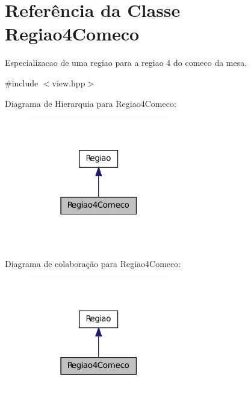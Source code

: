 \hypertarget{classRegiao4Comeco}{
\section{Referência da Classe Regiao4Comeco}
\label{classRegiao4Comeco}
}


Especializacao de uma regiao para a regiao 4 do comeco da mesa.  




{\ttfamily \#include $<$view.hpp$>$}



Diagrama de Hierarquia para Regiao4Comeco:\nopagebreak
\begin{figure}[H]
\begin{center}
\leavevmode
\includegraphics[width=174pt]{classRegiao4Comeco__inherit__graph}
\end{center}
\end{figure}


Diagrama de colaboração para Regiao4Comeco:\nopagebreak
\begin{figure}[H]
\begin{center}
\leavevmode
\includegraphics[width=174pt]{classRegiao4Comeco__coll__graph}
\end{center}
\end{figure}
